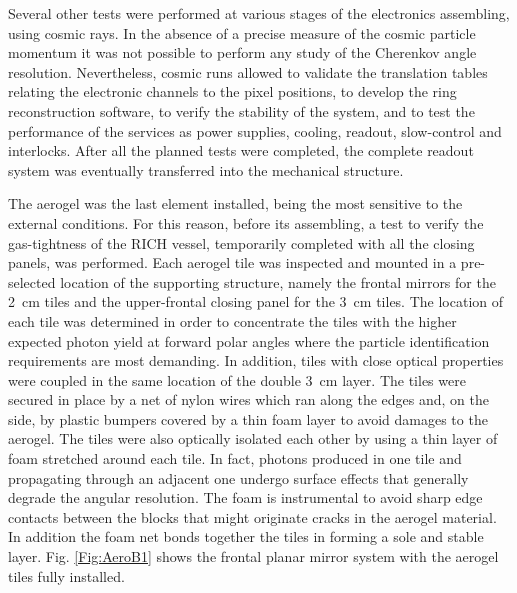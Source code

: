 \documentclass[5p,times,twocolumn]{elsarticle}
\begin{document}
Several other tests were performed at various stages of the electronics assembling, using cosmic rays.
In the absence of a precise measure of the cosmic particle momentum it was not possible to perform any study of the Cherenkov angle resolution.
Nevertheless, cosmic runs allowed to validate the translation tables relating the electronic channels to the pixel positions, to develop the ring reconstruction software, to verify the stability of the system, and to test the performance of the services as power supplies, cooling, readout, slow-control and interlocks. After all the planned tests were completed, the complete readout system was eventually transferred into the mechanical structure.

The aerogel was the last element installed, being the most sensitive to the external conditions. For this reason, before its assembling, a test to verify the gas-tightness of the RICH vessel, temporarily completed with all the closing panels, was performed. Each aerogel tile was inspected and mounted in a pre-selected location of the supporting structure, namely the frontal mirrors for the 2~cm tiles and the upper-frontal closing panel for the 3~cm tiles. The location of each tile was determined in order to concentrate the tiles with the higher expected photon yield at forward polar angles where the particle identification requirements are most demanding. In addition, tiles with close optical properties were coupled in the same location of the double 3~cm layer. The tiles were secured in place by a net of nylon wires which ran along the edges and, on the side, by plastic bumpers covered by a thin foam layer to avoid damages to the aerogel. The tiles were also optically isolated each other by using a thin layer of foam stretched around each tile. In fact, photons produced in one tile and propagating through an adjacent one undergo surface effects that generally degrade the angular resolution. The foam is instrumental to avoid sharp edge contacts between the blocks that might originate cracks in the aerogel material. In addition the foam net bonds together the tiles in forming a sole and stable layer. Fig. \ref{Fig:AeroB1} shows the frontal planar mirror system with the aerogel tiles fully installed.
\end{document}
